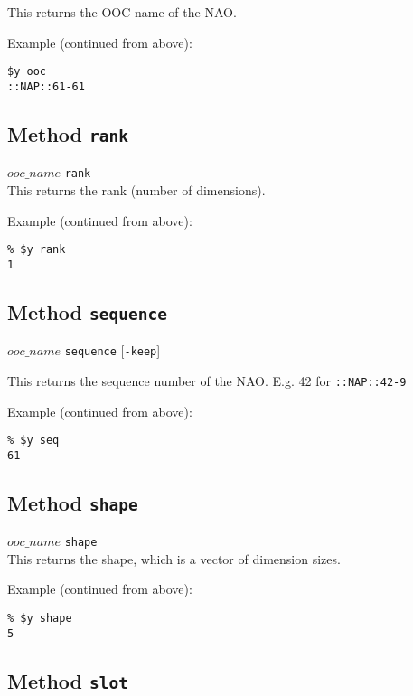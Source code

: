 This returns the OOC-name of the NAO.

Example (continued from above):
  \begin{verbatim}
$y ooc
::NAP::61-61
\end{verbatim}

\subsection{Method \texttt{rank}}
    \label{ooc-meta-rank}

  $ooc\_name$ 
  \texttt{rank}
  \\
  

This returns the rank (number of dimensions).
  
Example (continued from above):
  \begin{verbatim}
% $y rank
1
\end{verbatim}

\subsection{Method \texttt{sequence}}
    \label{ooc-meta-sequence}

$ooc\_name$ \texttt{sequence} [\texttt{-keep}]

This returns the sequence number of the NAO. E.g. 42 for 
  \texttt{::NAP::42-9}

Example (continued from above):
  \begin{verbatim}
% $y seq
61
\end{verbatim}

\subsection{Method \texttt{shape}}
    \label{ooc-meta-shape}

  


  $ooc\_name$ 
  \texttt{shape}
  \\
  

This returns the shape, which is a vector of dimension sizes.
  
Example (continued from above):
  \begin{verbatim}
% $y shape
5
\end{verbatim}

\subsection{Method \texttt{slot}}
    \label{ooc-meta-slot}


